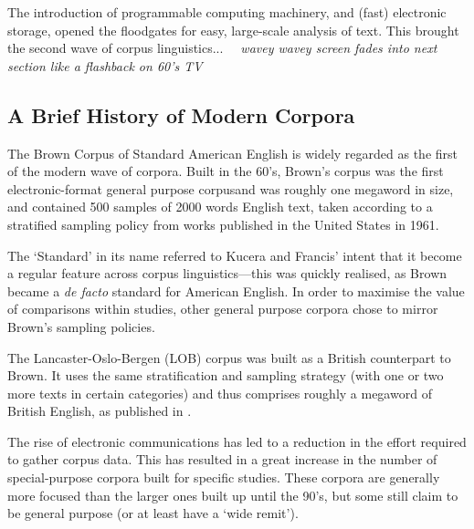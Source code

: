 The introduction of programmable computing machinery, and (fast) electronic storage, opened the floodgates for easy, large-scale analysis of text.  This brought the second wave of corpus linguistics... \textsl{~~wavey wavey screen fades into next section like a flashback on 60's TV~~}



\subsection{A Brief History of Modern Corpora}
The Brown Corpus of Standard American English %
is widely regarded as the first of the modern wave of corpora.  Built in the 60's, Brown's corpus was the first electronic-format general purpose corpusand was roughly one megaword in size, and contained 500 samples of 2000 words English text, taken according to a stratified sampling policy from works published in the United States in 1961.

The `Standard' in its name referred to Kucera and Francis' intent that it become a regular feature across corpus linguistics---this was quickly realised, as Brown became a \textsl{de facto} standard for American English.  In order to maximise the value of comparisons within studies, other general purpose corpora chose to mirror Brown's sampling policies.  


The Lancaster-Oslo-Bergen (LOB) corpus was built as a British counterpart to Brown.  %
It uses the same stratification and sampling strategy (with one or two more texts in certain categories) and thus comprises roughly a megaword of British English, as published in  %
.




\til{ }

The rise of electronic communications has led to a reduction in the effort required to gather corpus data.  This has resulted in a great increase in the number of special-purpose corpora built for specific studies.  These corpora are generally more focused than the larger ones built up until the 90's, but some still claim to be general purpose (or at least have a `wide remit').  

